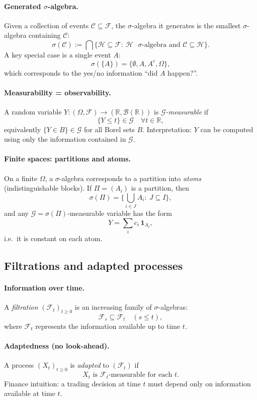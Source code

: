 \documentclass[11pt]{article}
\newcommand{\R}{\mathbb{R}}
\newcommand{\1}{\mathbf{1}}
\theoremstyle{plain}
\theoremstyle{definition}
\theoremstyle{remark}
\begin{document}
\paragraph{Generated $\sigma$-algebra.}
Given a collection of events $\mathcal C\subseteq\mathcal F$, the $\sigma$-algebra it generates is the smallest $\sigma$-algebra containing $\mathcal C$:
\[
\sigma(\mathcal C)
:=\bigcap\{\mathcal H\subseteq\mathcal F:\ \mathcal H\text{ $\sigma$-algebra and }\mathcal C\subseteq\mathcal H\}.
\]
A key special case is a single event $A$:
\[
\sigma(\{A\})=\{\emptyset,A,A^c,\Omega\},
\]
which corresponds to the yes/no information “did $A$ happen?”.

\paragraph{Measurability = observability.}
A random variable $Y:(\Omega,\mathcal F)\to(\R,\mathcal B(\R))$ is \emph{$\mathcal G$-measurable} if
\[
\{Y\le t\}\in\mathcal G \quad \forall t\in\R,
\]
equivalently $\{Y\in B\}\in\mathcal G$ for all Borel sets $B$.
Interpretation: $Y$ can be computed using only the information contained in $\mathcal G$.

\paragraph{Finite spaces: partitions and atoms.}
On a finite $\Omega$, a $\sigma$-algebra corresponds to a partition into \emph{atoms}
(indistinguishable blocks). If $\Pi=(A_i)$ is a partition, then
\[
\sigma(\Pi)=\Big\{\bigcup_{i\in J}A_i:\ J\subseteq I\Big\},
\]
and any $\mathcal G=\sigma(\Pi)$-measurable variable has the form
\[
Y=\sum_i c_i\,\mathbf 1_{A_i},
\]
i.e.\ it is constant on each atom.

\subsection{Filtrations and adapted processes}

\paragraph{Information over time.}
A \emph{filtration} $(\mathcal F_t)_{t\ge 0}$ is an increasing family of $\sigma$-algebras:
\[
\mathcal F_s\subseteq\mathcal F_t\quad (s\le t),
\]
where $\mathcal F_t$ represents the information available up to time $t$.

\paragraph{Adaptedness (no look-ahead).}
A process $(X_t)_{t\ge 0}$ is \emph{adapted} to $(\mathcal F_t)$ if
\[
X_t \text{ is }\mathcal F_t\text{-measurable for each }t.
\]
Finance intuition: a trading decision at time $t$ must depend only on information available at time $t$.
\end{document}
